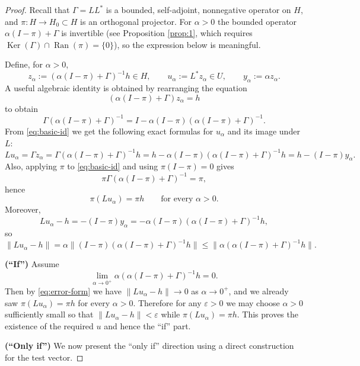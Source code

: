 \documentclass[12pt]{article}
\DeclareMathOperator{\Ran}{Ran}
\DeclareMathOperator{\Ker}{Ker}
\begin{document}
	\begin{proof}
		Recall that \(\Gamma = LL^*\) is a bounded, self-adjoint, nonnegative operator on \(H\), and \(\pi: H \to H_0 \subset H\) is an orthogonal projector. For \(\alpha > 0\) the bounded operator \(\alpha(I-\pi) + \Gamma\) is invertible (see Proposition \ref{prop:1}, which requires \(\Ker(\Gamma) \cap \Ran(\pi) = \{0\}\)), so the expression below is meaningful.
		
		Define, for \(\alpha > 0\),
		\[
		z_\alpha := (\alpha(I-\pi)+\Gamma)^{-1} h \in H,
		\qquad
		u_\alpha := L^* z_\alpha \in U,
		\qquad
		y_\alpha := \alpha z_\alpha.
		\]
		A useful algebraic identity is obtained by rearranging the equation
		\[
		(\alpha(I-\pi)+\Gamma) z_\alpha = h
		\]
		to obtain
		\begin{equation}\label{eq:basic-id}
			\Gamma(\alpha(I-\pi)+\Gamma)^{-1} = I - \alpha (I-\pi)(\alpha(I-\pi)+\Gamma)^{-1}.
		\end{equation}
		From \eqref{eq:basic-id} we get the following exact formulas for \(u_\alpha\) and its image under \(L\):
		\[
		L u_\alpha = \Gamma z_\alpha = \Gamma(\alpha(I-\pi)+\Gamma)^{-1} h
		= h - \alpha (I-\pi)(\alpha(I-\pi)+\Gamma)^{-1} h
		= h - (I-\pi) y_\alpha.
		\]
		Also, applying \(\pi\) to \eqref{eq:basic-id} and using \(\pi(I-\pi)=0\) gives
		\[
		\pi\Gamma(\alpha(I-\pi)+\Gamma)^{-1} = \pi,
		\]
		hence
		\[
		\pi(Lu_\alpha)=\pi h \qquad\text{for every }\alpha>0.
		\]
		Moreover,
		\begin{equation}\label{eq:error-form}
			Lu_\alpha - h = - (I-\pi) y_\alpha
			= -\alpha (I-\pi)(\alpha(I-\pi)+\Gamma)^{-1} h,
		\end{equation}
		so
		\[
		\|Lu_\alpha-h\| = \alpha\big\|(I-\pi)(\alpha(I-\pi)+\Gamma)^{-1}h\big\|
		\le \big\| \alpha(\alpha(I-\pi)+\Gamma)^{-1} h\big\|.
		\]
		
		\medskip\noindent
		\textbf{(``If'')} Assume
		\[
		\lim_{\alpha\to0^+}\alpha(\alpha(I-\pi)+\Gamma)^{-1}h = 0.
		\]
		Then by \eqref{eq:error-form} we have \(\|Lu_\alpha-h\|\to0\) as \(\alpha\to0^+\), and we already saw \(\pi(Lu_\alpha)=\pi h\) for every \(\alpha>0\). Therefore for any \(\varepsilon>0\) we may choose \(\alpha>0\) sufficiently small so that \(\|Lu_\alpha-h\|<\varepsilon\) while \(\pi(Lu_\alpha)=\pi h\). This proves the existence of the required \(u\) and hence the ``if'' part.
		
		\medskip\noindent
		\textbf{(``Only if'')} We now present the ``only if'' direction using a direct construction for the test vector.
		

\end{proof}
\end{document}
